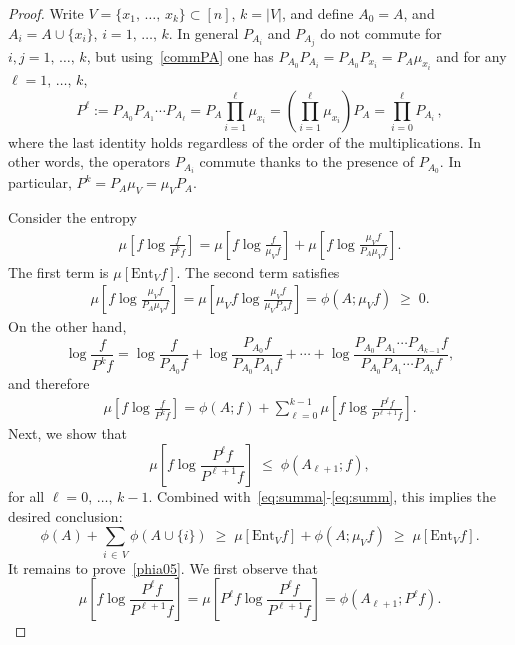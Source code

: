 \documentclass[10pt,a4paper]{amsart}
\renewcommand{\leq}{\;\leqslant\;}
\renewcommand{\geq}{\;\geqslant\;}
\newcommand{\ent}{\mathrm{Ent}}
\theoremstyle{definition}
\theoremstyle{plain}
\numberwithin{equation}{section}
\begin{document}
\begin{proof}
Write $V=\{x_1,\,\dots,\,x_k\}\subset [n]$, $k=|V|$, and define $A_0=A$, and $A_i=A\cup\{x_i\}$, $i=1,\,\dots,\,k$. In general $P_{A_i}$ and $P_{A_j}$ do not commute for $i,j=1,\,\dots,\,k$, but using~\eqref{commPA} one has $P_{A_0}P_{A_i} = P_{A_0}P_{x_i}= P_A\mu_{x_i}$ and for any $\ell=1,\,\dots,\,k$,
\[
P^\ell:=P_{A_0}P_{A_1}\cdots P_{A_\ell} = P_A\prod_{i=1}^\ell \mu_{x_i}= \left(\prod_{i=1}^\ell \mu_{x_i} \right)P_A =\prod_{i=0}^\ell P_{A_i}\,,
\]
where the last identity holds regardless of the order of the multiplications. In other words, the operators $P_{A_i}$ commute thanks to the presence of $P_{A_0}$. In particular, $P^k=P_A\mu_V=\mu_VP_A$.

Consider the entropy
\begin{align}\label{eq:summa}
\mu\left[f\log\frac{f}{P^kf}\right] = \mu\left[f\log\frac{f}{\mu_Vf}\right] + \mu\left[f\log\frac{\mu_Vf}{P_A\mu_Vf}\right].
\end{align}
The first term is $\mu\left[\ent_Vf\right]$. The second term satisfies
\begin{align}\label{eq:summaa}
\mu\left[f\log\frac{\mu_Vf}{P_A\mu_Vf}\right] = \mu\left[\mu_Vf\log\frac{\mu_Vf}{\mu_VP_Af}\right] = \phi(A;\mu_Vf)\geq 0.
\end{align}
On the other hand,
\[
\log\frac{f}{P^kf}=\log\frac{f}{P_{A_0} f} + \log\frac{P_{A_0}f}{P_{A_0}P_{A_1}f}+\cdots+\log\frac{P_{A_0}P_{A_1}\cdots P_{A_{k-1}} f}{P_{A_0}P_{A_1}\cdots P_{A_k} f},
\]
and therefore
\begin{align}\label{eq:summ}
\mu\left[f\log\frac{f}{P^kf}\right] = \phi(A;f)+\sum_{\ell=0}^{k-1}\mu\left[f\log\frac{P^\ell f}{P^{\ell+1}f}\right].
\end{align}
Next, we show that
\begin{equation}\label{phia05}
\mu\left[f\log\frac{P^\ell f}{P^{\ell+1}f}\right]
\leq \phi\left(A_{\ell+1};f\right),
\end{equation}
for all $\ell=0,\,\dots,\,k-1$. Combined with~\eqref{eq:summa}-\eqref{eq:summ}, this implies the desired conclusion:
\begin{equation}\label{phia5x}
\phi(A) + \sum_{i\,\in\,V}\phi(A\cup\{i\})\geq \mu\left[\ent_{V}f \right] + \phi(A;\mu_V f)\geq \mu\left[\ent_{V}f \right].
\end{equation}
It remains to prove~\eqref{phia05}. We first observe that
\begin{equation}\label{phia5xx}
\mu\left[f\log\frac{P^\ell f}{P^{\ell+1}f}\right]=\mu\left[P^\ell f\log\frac{P^\ell f}{P^{\ell+1}f}\right]=\phi\left(A_{\ell+1};P^\ell f\right).

\end{equation}
\end{proof}
\end{document}
